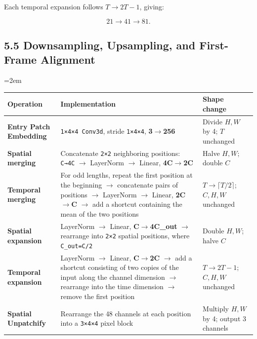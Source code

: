 \documentclass[
  11pt,
  a4paper,
]{article}
\newcounter{none} %
\newcommand{\NotesTableStyle}{\linespread{1}\fontsize{9.5pt}{13pt}\selectfont\setlength{\tabcolsep}{4pt}\renewcommand{\arraystretch}{1.1}\setlength{\extrarowheight}{5pt}\setlength{\LTpre}{5pt}\setlength{\LTpost}{6pt}\setlength{\parskip}{0pt}\emergencystretch=2em}
\begin{document}
Each temporal expansion follows \textbf{\(T\rightarrow2T-1\)}, giving:

\[
21\rightarrow41\rightarrow81.
\]

\clearpage

\subsection{5.5 Downsampling, Upsampling, and First-Frame
Alignment}\label{flux3-sampling}

\begingroup\NotesTableStyle\fontsize{10pt}{12pt}\selectfont\renewcommand{\arraystretch}{1.02}\setlength{\extrarowheight}{1pt}

{\def\LTcaptype{none} %
\begin{longtable}[]{@{}
  >{\raggedright\arraybackslash}p{}
  >{\raggedright\arraybackslash}p{}
  >{\raggedright\arraybackslash}p{}@{}}
\toprule\noalign{}
\begin{minipage}[b]{\linewidth}\raggedright
Operation
\end{minipage} & \begin{minipage}[b]{\linewidth}\raggedright
Implementation
\end{minipage} & \begin{minipage}[b]{\linewidth}\raggedright
Shape change
\end{minipage} \\
\midrule\noalign{}
\endhead
\bottomrule\noalign{}
\endlastfoot
\textbf{Entry Patch Embedding} & \texttt{1×4×4\ Conv3d}, stride
\texttt{1×4×4}, \textbf{3\(\rightarrow\)256} & Divide \(H,W\) by 4;
\(T\) unchanged \\
\textbf{Spatial merging} & Concatenate \texttt{2×2} neighboring
positions: \texttt{C→4C} \(\rightarrow\) LayerNorm \(\rightarrow\)
Linear, \textbf{4C\(\rightarrow\)2C} & Halve \(H,W\); double \(C\) \\
\textbf{Temporal merging} & For odd lengths, repeat the first position
at the beginning \(\rightarrow\) concatenate pairs of positions
\(\rightarrow\) LayerNorm \(\rightarrow\) Linear,
\textbf{2C\(\rightarrow\)C} \(\rightarrow\) add a shortcut containing
the mean of the two positions & \(T\rightarrow\lceil T/2\rceil\);
\(C,H,W\) unchanged \\
\textbf{Spatial expansion} & LayerNorm \(\rightarrow\) Linear,
\textbf{C\(\rightarrow\)4C\_out} \(\rightarrow\) rearrange into
\texttt{2×2} spatial positions, where \texttt{C\_out=C/2} & Double
\(H,W\); halve \(C\) \\
\textbf{Temporal expansion} & LayerNorm \(\rightarrow\) Linear,
\textbf{C\(\rightarrow\)2C} \(\rightarrow\) add a shortcut consisting of
two copies of the input along the channel dimension \(\rightarrow\)
rearrange into the time dimension \(\rightarrow\) remove the first
position & \(T\rightarrow2T-1\); \(C,H,W\) unchanged \\
\textbf{Spatial Unpatchify} & Rearrange the 48 channels at each position
into a \texttt{3×4×4} pixel block & Multiply \(H,W\) by 4; output 3
channels \\
\end{longtable}
}
\end{document}
